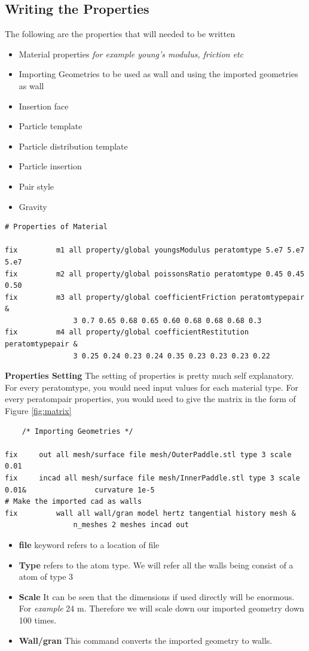 \documentclass{tufte-book} %
\begin{document}
\subsection{Writing the Properties}
The following are the properties that will needed to be written 
\begin{itemize}
\item Material properties \textit{for example young's modulus, friction etc}
\item Importing Geometries to be used as wall and using the imported geometries as wall
\item Insertion face
\item Particle template
\item Particle distribution template
\item Particle insertion 
\item Pair style
\item Gravity
\end{itemize}

\begin{verbatim}
# Properties of Material

fix 		m1 all property/global youngsModulus peratomtype 5.e7 5.e7 5.e7
fix 		m2 all property/global poissonsRatio peratomtype 0.45 0.45 0.50 
fix 		m3 all property/global coefficientFriction peratomtypepair &
                3 0.7 0.65 0.68 0.65 0.60 0.68 0.68 0.68 0.3
fix 		m4 all property/global coefficientRestitution peratomtypepair &
                3 0.25 0.24 0.23 0.24 0.35 0.23 0.23 0.23 0.22
  \end{verbatim}
  \textbf{Properties Setting}
  The setting of properties is pretty much self explanatory. For every peratomtype, you would need input values for each material type. For every peratompair properties, you would need to give the matrix in the form of Figure \ref{fig:matrix}
  \begin{verbatim}
    /* Importing Geometries */
   
fix		out all mesh/surface file mesh/OuterPaddle.stl type 3 scale 0.01
fix		incad all mesh/surface file mesh/InnerPaddle.stl type 3 scale 0.01&                curvature 1e-5 
# Make the imported cad as walls 
fix 		wall all wall/gran model hertz tangential history mesh &
                n_meshes 2 meshes incad out
  \end{verbatim}
  \begin{itemize}
  \item \textbf{file} keyword refers to a location of file 
  \item \textbf{Type} refers to the atom type. We will refer all the walls being consist of a atom of type 3
  \item \textbf{Scale} It can be seen that the dimensions if used directly will be enormous. For \textit{example} 24 m. Therefore we will scale down our imported geometry down 100 times. 
  \item \textbf{Wall/gran} This command converts the imported geometry to walls.

  \end{itemize}
  
\end{document}
